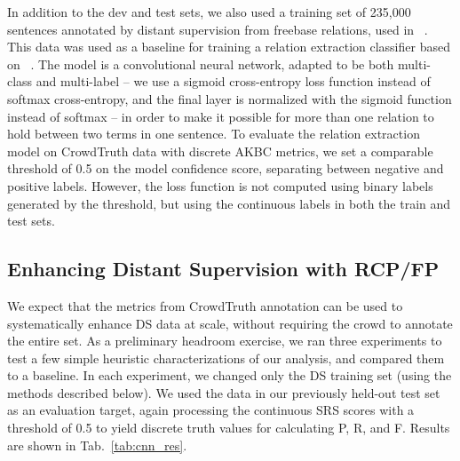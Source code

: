 In addition to the dev and test sets, we also used a training set of 235,000 sentences annotated by distant supervision from freebase relations, used in ~\cite{riedel2013universalschema}.  This data was used as a baseline for training a relation extraction classifier based on ~\cite{nguyen2015relation}.  The model is a convolutional neural network, adapted to be both multi-class and multi-label -- we use a sigmoid cross-entropy loss function instead of softmax cross-entropy, and the final layer is normalized with the sigmoid function instead of softmax -- in order to make it possible for more than one relation to hold between two terms in one sentence.
To evaluate the relation extraction model on CrowdTruth data with discrete AKBC metrics, we set a comparable threshold of 0.5 on the model confidence score, separating between negative and positive labels. However, the loss function is not computed using binary labels generated by the threshold, but using the continuous labels in both the train and test sets.

\subsection{Enhancing Distant Supervision with RCP/FP}
We expect that the metrics from CrowdTruth annotation can be used to systematically enhance DS data at scale, without requiring the crowd to annotate the entire set.  As a preliminary headroom exercise, we ran three experiments to test a few simple heuristic characterizations of our analysis, and compared them to a baseline.  In each experiment, we changed only the DS training set (using the methods described below).  We used the data in our previously held-out test set as an evaluation target, again processing the continuous SRS scores with a threshold of 0.5 to yield discrete truth values for calculating P, R, and F.  Results are shown in Tab.~\ref{tab:cnn_res}.

